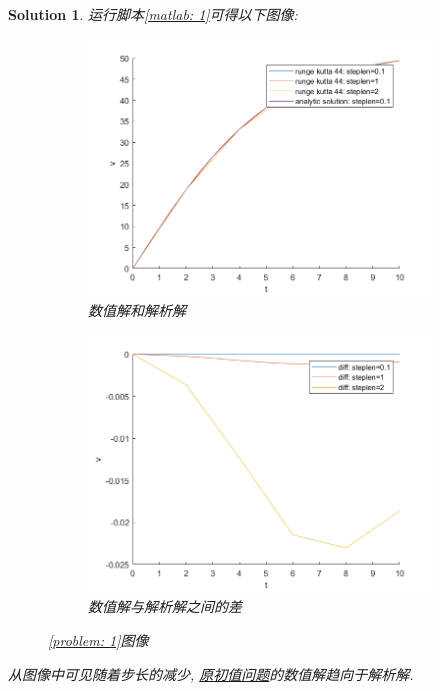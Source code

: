 \documentclass[a4paper, 12pt]{ctexart}
\theoremstyle{plain}
\theoremstyle{plain}
\theoremstyle{plain}
\theoremstyle{nonumberplain}
\newtheorem{solution}{Solution}
\begin{document}
    \begin{solution}
        运行脚本\ref{matlab: 1}可得以下图像:
        \begin{figure}[H]
            \centering
            \begin{subfigure}[b]{0.45\textwidth}
                \centering
                \includegraphics[width=\textwidth]{wc11.png}
                \caption{数值解和解析解}
            \end{subfigure}
            \hfill
            \begin{subfigure}[b]{0.45\textwidth}
                \centering
                \includegraphics[width=\textwidth]{wc12.png}
                \caption{数值解与解析解之间的差}
            \end{subfigure}
            \caption{\ref{problem: 1}图像}
       \end{figure}
       从图像中可见随着步长的减少, \hyperref[equation: problem1]{原初值问题}的数值解趋向于解析解.
    \end{solution}
\end{document}
